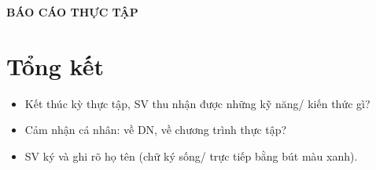 \documentclass[a4paper]{article}
\theoremstyle{definition}
\begin{document}
\renewcommand{\figurename}{Hình}
\renewcommand{\tablename}{Bảng}

\hypersetup{pageanchor=false}

\hypersetup{pageanchor=true}

\thispagestyle{empty}
\null
\newpage

\thispagestyle{empty}
\vspace*{\fill}
\begin{center}
{\fontsize{36}{44}\selectfont\bfseries BÁO CÁO THỰC TẬP\par}
\end{center}
\vspace*{\fill}
\clearpage

\tableofcontents
\clearpage




\newpage
\section{Tổng kết}
\begin{itemize}
    \item Kết thúc kỳ thực tập, SV thu nhận được những kỹ năng/ kiến thức gì?
    \item Cảm nhận cá nhân: về DN, về chương trình thực tập?
    \item SV ký và ghi rõ họ tên (chữ ký sống/ trực tiếp bằng bút màu xanh).
\end{itemize}

\end{document}

